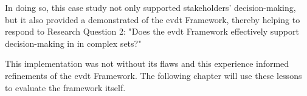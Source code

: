 In doing so, this case study not only supported stakeholders' decision-making, but it also provided a demonstrated of the \ac{evdt} Framework, thereby helping to respond to Research Question 2: "Does the \ac{evdt} Framework effectively support decision-making in in complex \ac{sets}?"

This implementation was not without its flaws and this experience informed refinements of the \ac{evdt} Framework. The following chapter will use these lessons to evaluate the framework itself.

